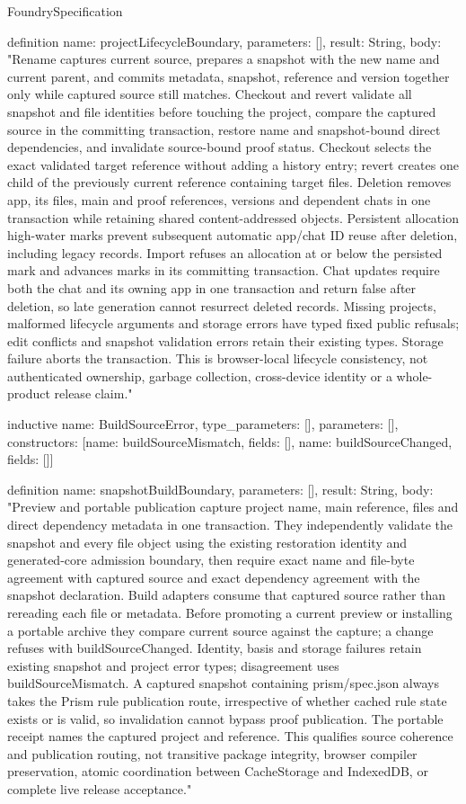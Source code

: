 \begin{lexlean}{FoundrySpecification}
\begin{semanticmodule}
definition{
  name: projectLifecycleBoundary,
  parameters: [],
  result: String,
  body: "Rename captures current source, prepares a snapshot with the new name and current parent, and commits metadata, snapshot, reference and version together only while captured source still matches. Checkout and revert validate all snapshot and file identities before touching the project, compare the captured source in the committing transaction, restore name and snapshot-bound direct dependencies, and invalidate source-bound proof status. Checkout selects the exact validated target reference without adding a history entry; revert creates one child of the previously current reference containing target files. Deletion removes app, its files, main and proof references, versions and dependent chats in one transaction while retaining shared content-addressed objects. Persistent allocation high-water marks prevent subsequent automatic app/chat ID reuse after deletion, including legacy records. Import refuses an allocation at or below the persisted mark and advances marks in its committing transaction. Chat updates require both the chat and its owning app in one transaction and return false after deletion, so late generation cannot resurrect deleted records. Missing projects, malformed lifecycle arguments and storage errors have typed fixed public refusals; edit conflicts and snapshot validation errors retain their existing types. Storage failure aborts the transaction. This is browser-local lifecycle consistency, not authenticated ownership, garbage collection, cross-device identity or a whole-product release claim."
}

inductive{
  name: BuildSourceError,
  type_parameters: [],
  parameters: [],
  constructors: [{name: buildSourceMismatch, fields: []}, {name: buildSourceChanged, fields: []}]
}

definition{
  name: snapshotBuildBoundary,
  parameters: [],
  result: String,
  body: "Preview and portable publication capture project name, main reference, files and direct dependency metadata in one transaction. They independently validate the snapshot and every file object using the existing restoration identity and generated-core admission boundary, then require exact name and file-byte agreement with captured source and exact dependency agreement with the snapshot declaration. Build adapters consume that captured source rather than rereading each file or metadata. Before promoting a current preview or installing a portable archive they compare current source against the capture; a change refuses with buildSourceChanged. Identity, basis and storage failures retain existing snapshot and project error types; disagreement uses buildSourceMismatch. A captured snapshot containing prism/spec.json always takes the Prism rule publication route, irrespective of whether cached rule state exists or is valid, so invalidation cannot bypass proof publication. The portable receipt names the captured project and reference. This qualifies source coherence and publication routing, not transitive package integrity, browser compiler preservation, atomic coordination between CacheStorage and IndexedDB, or complete live release acceptance."
}


\end{semanticmodule}
\end{lexlean}
